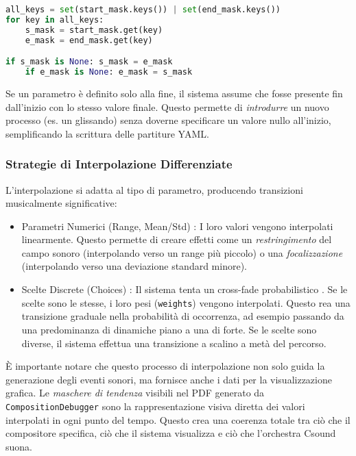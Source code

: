 \begin{lstlisting}[language=Python]
all_keys = set(start_mask.keys()) | set(end_mask.keys())
for key in all_keys:
    s_mask = start_mask.get(key)
    e_mask = end_mask.get(key)

if s_mask is None: s_mask = e_mask
    if e_mask is None: e_mask = s_mask
\end{lstlisting}
Se un parametro è definito solo alla fine, il sistema assume che fosse presente fin dall'inizio con lo stesso valore finale. Questo permette di \textit{introdurre} un nuovo processo (es. un glissando) senza doverne specificare un valore nullo all'inizio, semplificando la scrittura delle partiture YAML.
\subsubsection{Strategie di Interpolazione Differenziate}
L'interpolazione si adatta al tipo di parametro, producendo transizioni musicalmente significative:

\begin{itemize}
 \item Parametri Numerici (Range, Mean/Std) : I loro valori vengono interpolati linearmente. Questo permette di creare effetti come un \textit{restringimento} del campo sonoro (interpolando verso un range più piccolo) o una \textit{focalizzazione} (interpolando verso una deviazione standard minore).
\end{itemize}

\begin{itemize}
 \item Scelte Discrete (Choices) : Il sistema tenta un  cross-fade probabilistico . Se le scelte sono le stesse, i loro pesi (\texttt{weights}) vengono interpolati. Questo rea una transizione graduale nella probabilità di occorrenza, ad esempio passando da una predominanza di dinamiche piano a una di forte. Se le scelte sono diverse, il sistema effettua una transizione a scalino a metà del percorso.
\end{itemize}

È importante notare che questo processo di interpolazione non solo guida la generazione degli eventi sonori, ma fornisce anche i dati per la visualizzazione grafica. Le \textit{maschere di tendenza} visibili nel PDF generato da \texttt{CompositionDebugger} sono la rappresentazione visiva diretta dei valori interpolati in ogni punto del tempo. Questo crea una coerenza totale tra ciò che il compositore specifica, ciò che il sistema visualizza e ciò che l'orchestra Csound suona.
